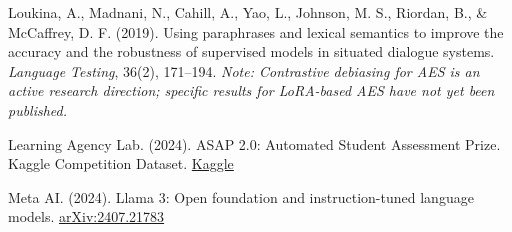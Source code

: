 \documentclass[12pt]{article}
\begin{document}
\begin{enumerate}[label={[\arabic*]}, leftmargin=*, itemsep=4pt]
    \item \hypertarget{ref16}{} Loukina, A., Madnani, N., Cahill, A., Yao, L., Johnson, M. S., Riordan, B., \& McCaffrey, D. F. (2019). Using paraphrases and lexical semantics to improve the accuracy and the robustness of supervised models in situated dialogue systems. \textit{Language Testing}, 36(2), 171--194. \textit{Note: Contrastive debiasing for AES is an active research direction; specific results for LoRA-based AES have not yet been published.}

    \item \hypertarget{ref17}{} Learning Agency Lab. (2024). ASAP 2.0: Automated Student Assessment Prize. Kaggle Competition Dataset. \href{https://www.kaggle.com/competitions/learning-agency-lab-automated-essay-scoring-2}{Kaggle}

    \item \hypertarget{ref18}{} Meta AI. (2024). Llama 3: Open foundation and instruction-tuned language models. \href{https://arxiv.org/abs/2407.21783}{arXiv:2407.21783}

\end{enumerate}
\end{document}
